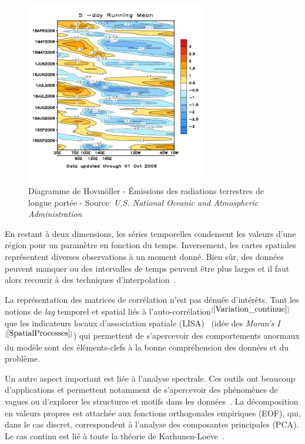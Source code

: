 \begin{figure}[h]
\includegraphics[width=8cm]{Representation/MJO_5-day_running_mean_through_1_Oct_2006}
\centering
\caption{Diagramme de Hovmöller - Émissions des radiations terrestres de longue portée - Source: \textit{U.S. National Oceanic and Atmospheric Administration}}
\end{figure}

En restant à deux dimensions, les séries temporelles condensent les valeurs d'une région pour un paramètre en fonction du temps. Inversement, les cartes spatiales représentent diverses observations à un moment donné. Bien sûr, des données peuvent manquer ou des intervalles de temps peuvent être plus larges et il faut alors recourir à des techniques d'interpolation~\cite{peterson1994spatial}.

La représentation des matrices de corrélation n'est pas dénuée d'intérêts. Tant les notions de \textit{lag} temporel et spatial liés à l'auto-corrélation$^{[\ref{Variation_continue}]}$~\cite{andrienko2003exploratory} que les indicateurs locaux d'association spatiale (LISA)~\cite{anselin1995local} (idée des \textit{Moran's I}$^{[\ref{SpatialProcesses}]}$) qui permettent de s'apercevoir des comportements anormaux du modèle sont des éléments-clefs à la bonne compréhension des données et du problème.

Un autre aspect important est liée à l'analyse spectrale. Ces outils ont beaucoup d'applications et permettent notamment de s'apercevoir des phénomènes de vagues ou d'explorer les structures et motifs dans les données~\cite{chen2007handbook, renshaw1983interpretation}. La décomposition en valeurs propres est attachée aux fonctions orthogonales empiriques (EOF), qui, dans le cas discret, correspondent à l'analyse des composantes principales (PCA). Le cas continu est lié à toute la théorie de Karhunen-Loeve~\cite{jolliffe2002principal}.

